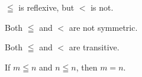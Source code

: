 \begin{proposition}[Reflexivity]
$\leqq$ is reflexive, but
$<$ is not.\end{proposition}
\begin{proposition}[Symmetry]
Both $\leqq$ and $<$ are not symmetric.\end{proposition}
\begin{proposition}[Transitivity]
Both $\leqq$ and $<$ are transitive.\end{proposition}
\begin{proposition}[Antisymmetry]
If $m \leqq n$ and $n \leqq n$, then $m = n$.\end{proposition}
